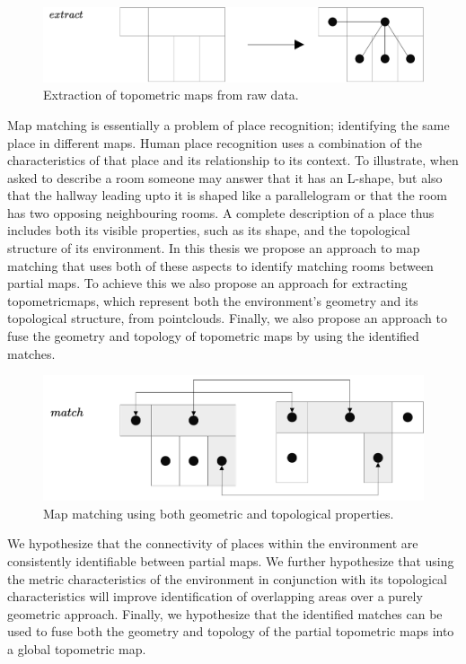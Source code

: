 \begin{figure}[h]
    \centering
    \includegraphics*[width=.8\textwidth]{./fig/overview_diagrams-Page-2.drawio.pdf}
    \caption{Extraction of topometric maps from raw data.}
    \label{fig:overview}
\end{figure}


Map matching is essentially a problem of place recognition; identifying the same place in different maps. Human place recognition uses a combination of the characteristics of that place and its relationship to its context. To illustrate, when asked to describe a room someone may answer that it has an L-shape, but also that the hallway leading upto it is shaped like a parallelogram or that the room has two opposing neighbouring rooms. A complete description of a place thus includes both its visible properties, such as its shape, and the topological structure of its environment. In this thesis we propose an approach to map matching that uses both of these aspects to identify matching rooms between partial maps. To achieve this we also propose an approach for extracting \gls{topometricmap}s, which represent both the environment's geometry and its topological structure, from \gls{pointcloud}s. Finally, we also propose an approach to fuse the geometry and topology of topometric maps by using the identified matches.


\begin{figure}[h]
    \centering
    \includegraphics*[width=.8\textwidth]{./fig/overview_diagrams-Page-3.drawio.pdf}
    \caption{Map matching using both geometric and topological properties.}
    \label{fig:overview_diagram}

\end{figure}


We hypothesize that the connectivity of places within the environment are consistently identifiable between partial maps. We further hypothesize that using the metric characteristics of the environment in conjunction with its topological characteristics will improve identification of overlapping areas over a purely geometric approach. Finally, we hypothesize that the identified matches can be used to fuse both the geometry and topology of the partial topometric maps into a global topometric map.

